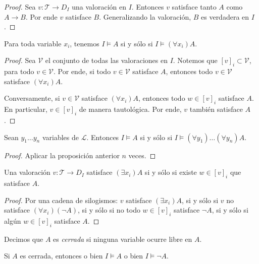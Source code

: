 \begin{proof}
Sea $v : \mathscr T \to D_I$ una valoración en $I$. Entonces $v$ satisface tanto $A$ como $A \to B$. Por ende $v$ satisface $B$. Generalizando la valoración, $B$ es verdadera en $I$.
\end{proof}

\begin{proposition}
Para toda variable $x_i$, tenemos $I \vDash A$ si y sólo si $I \vDash (\forall x_i) A$.
\end{proposition}

\begin{proof}
Sea $\mathscr V$ el conjunto de todas las valoraciones en $I$. Notemos que $[v]_i \subset \mathscr V$, para todo $v \in \mathscr V$. Por ende, si todo $v \in \mathscr V$ satisface $A$, entonces todo $v \in \mathscr V$ satisface $(\forall x_i) A$.

Conversamente, si $v \in \mathscr V$ satisface $(\forall x_i) A$, entonces todo $w \in [v]_i$ satisface $A$. En particular, $v \in [v]_i$ de manera tautológica. Por ende, $v$ también satisface $A$.
\end{proof}

\begin{corollary}
Sean $y_1 \dots y_n$ variables de $\mathscr L$. Entonces $I \vDash A$ si y sólo si $I \vDash (\forall y_1) \dots (\forall y_n) A$.
\end{corollary}

\begin{proof}
Aplicar la proposición anterior $n$ veces.
\end{proof}

\begin{proposition}
Una valoración $v : \mathscr T \to D_I$ satisface $(\exists x_i) A$ si y sólo si existe $w \in [v]_i$ que satisface $A$.
\end{proposition}

\begin{proof}
Por una cadena de silogismos: $v$ satisface $(\exists x_i) A$, si y sólo si $v$ no satisface $(\forall x_i) (\neg A)$, si y sólo si no todo $w \in [v]_i$ satisface $\neg A$, si y sólo si algún $w \in [v]_i$ satisface $A$.
\end{proof}

\begin{definition}
Decimos que $A$ es \textit{cerrada} si ninguna variable ocurre libre en $A$.
\end{definition}

\begin{proposition}
Si $A$ es cerrada, entonces o bien $I \vDash A$ o bien $I \vDash \neg A$.
\end{proposition}

